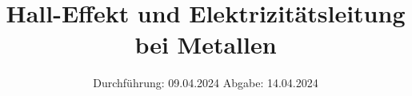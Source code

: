 

\subject{v511}
\title{Hall-Effekt und Elektrizitätsleitung bei Metallen}
\date{%
  Durchführung: 09.04.2024
  \hspace{3em}
  Abgabe: 14.04.2024
}



\maketitle
\thispagestyle{empty}
\tableofcontents
\newpage






\printbibliography{}

